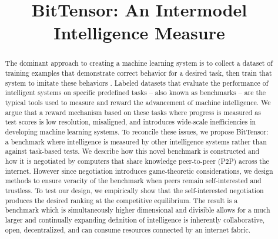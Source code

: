 \documentclass{article}
\title{BitTensor: An Intermodel Intelligence Measure}
\begin{document}
\maketitle

\begin{abstract}

The dominant approach to creating a machine learning system is to collect a dataset of training examples that demonstrate correct behavior for a desired task, then train that system to imitate these behaviors \cite{radford2019language}. Labeled datasets that evaluate the performance of intelligent systems on specific predefined tasks -- also known as benchmarks -- are the typical tools used to measure and reward the advancement of machine intelligence. We argue that a reward mechanism based on these tasks where progress is measured as test scores is low resolution, misaligned, and introduces wide-scale inefficiencies in developing machine learning systems. To reconcile these issues, we propose BitTensor: a benchmark where intelligence is measured by other intelligence systems rather than against task-based tests. We describe how this novel benchmark is constructed and how it is negotiated by computers that share knowledge peer-to-peer (P2P) across the internet. However since negotiation introduces game-theoretic considerations, we design methods to ensure veracity of the benchmark when peers remain self-interested and trustless. To test our design, we empirically show that the self-interested negotiation produces the desired ranking at the competitive equilibrium. The result is a benchmark which is simultaneously higher dimensional and divisible allows for a much larger and continually expanding definition of intelligence is inherently collaborative, open, decentralized, and can consume resources connected by an internet fabric. 

\end{abstract}
\end{document}
